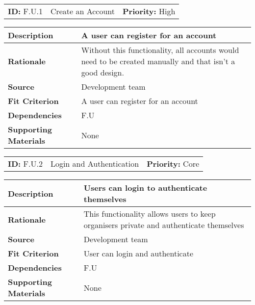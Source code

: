 \begin{table}[H]
    \begin{tabularx}{\textwidth}{| l | X | l |}
        \hline
        \textbf{ID:} F.U.1 & Create an Account & \textbf{Priority:} High \\
    \end{tabularx}
    \begin{tabularx}{\textwidth}{| l | X |}
        \hline
        \textbf{Description} & A user can register for an account \\ \hline
        \textbf{Rationale} & Without this functionality, all accounts would need to be created manually and that isn't a good design.\\ \hline
        \textbf{Source} & Development team\\ \hline
        \textbf{Fit Criterion} & A user can register for an account \\ \hline
        \textbf{Dependencies} & F.U \\ \hline
        \textbf{Supporting Materials} & None \\ \hline
    \end{tabularx}
\end{table}

\begin{table}[H]
    \begin{tabularx}{\textwidth}{| l | X | l |}
        \hline
        \textbf{ID:} F.U.2 & Login and Authentication & \textbf{Priority:} Core \\
    \end{tabularx}
    \begin{tabularx}{\textwidth}{| l | X |}
        \hline
        \textbf{Description} & Users can login to authenticate themselves \\ \hline
        \textbf{Rationale} & This functionality allows users to keep organisers private and authenticate themselves\\ \hline
        \textbf{Source} &  Development team\\ \hline
        \textbf{Fit Criterion} & User can login and authenticate\\ \hline
        \textbf{Dependencies} & F.U \\ \hline
        \textbf{Supporting Materials} & None \\ \hline
    \end{tabularx}
\end{table}

